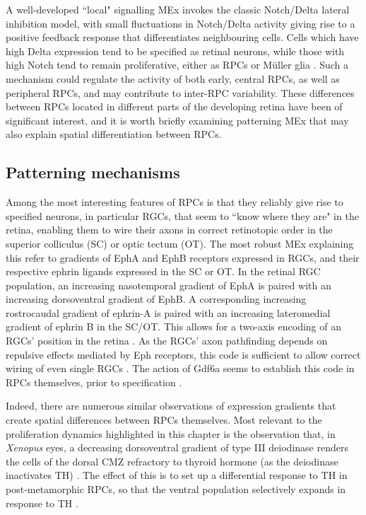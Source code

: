A well-developed ``local" signalling MEx invokes the classic Notch/Delta lateral inhibition model, with small fluctuations in Notch/Delta activity giving rise to a positive feedback response that differentiates neighbouring cells. Cells which have high Delta expression tend to be specified as retinal neurons, while those with high Notch tend to remain proliferative, either as RPCs or M{\"u}ller glia \cite{Dorsky1995,Dorsky1997}. Such a mechanism could regulate the activity of both early, central RPCs, as well as peripheral RPCs, and may contribute to inter-RPC variability. These differences between RPCs located in different parts of the developing retina have been of significant interest, and it is worth briefly examining patterning MEx that may also explain spatial differentiation between RPCs.

\subsection{Patterning mechanisms}

Among the most interesting features of RPCs is that they reliably give rise to specified neurons, in particular RGCs, that seem to ``know where they are" in the retina, enabling them to wire their axons in correct retinotopic order in the superior colliculus (SC) or optic tectum (OT). The most robust MEx explaining this refer to gradients of EphA and EphB receptors expressed in RGCs, and their respective ephrin ligands expressed in the SC or OT. In the retinal RGC population, an increasing nasotemporal gradient of EphA is paired with an increasing dorsoventral gradient of EphB. A corresponding increasing rostrocaudal gradient of ephrin-A is paired with an increasing lateromedial gradient of ephrin B in the SC/OT. 
This allows for a two-axis encoding of an RGCs' position in the retina \cite{Tsigankov2006}. As the RGCs' axon pathfinding depends on repulsive effects mediated by Eph receptors, this code is sufficient to allow correct wiring of even single RGCs \cite{Gosse2008}. The action of Gdf6a seems to establish this code in RPCs themselves, prior to specification \cite{French2009}.

Indeed, there are numerous similar observations of expression gradients that create spatial differences between RPCs themselves. Most relevant to the proliferation dynamics highlighted in this chapter is the observation that, in \textit{Xenopus} eyes, a decreasing dorsoventral gradient of type III deiodinase renders the cells of the dorsal CMZ refractory to thyroid hormone (as the deiodinase inactivates TH) \cite{Marsh-Armstrong1999}. The effect of this is to set up a differential response to TH in post-metamorphic RPCs, so that the ventral population selectively expands in response to TH \cite{Beach1979}. 

